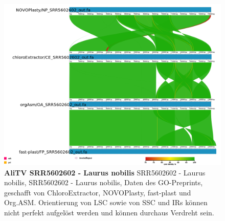 \documentclass{scrartcl}
\begin{document}
\begin{figure}
\includegraphics[width=.9\linewidth]{./SRR5602602.png}
\caption[AliTV SRR5602602 - Laurus nobilis]{\textbf{AliTV SRR5602602 - Laurus nobilis} SRR5602602 - Laurus nobilis, SRR5602602 - Laurus nobilis, Daten des GO-Preprints, geschafft von ChloroExtractor, NOVOPlasty, fast-plast und Org.ASM. Orientierung von LSC sowie von SSC und IRs können nicht perfekt aufgelöst werden und können durchaus Verdreht sein.}
\end{figure}
\end{document}
